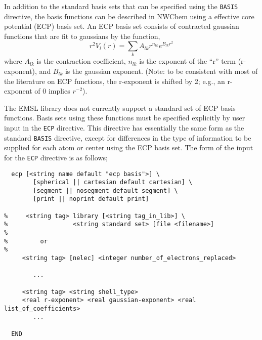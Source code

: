 \label{sec:ecp}

In addition to the standard basis sets that can be specified using the
\verb+BASIS+ directive, the basis functions can be described in NWChem
using a effective core potential (ECP) basis set.  An ECP basis set
consists of contracted gaussian functions that are fit to gaussians by the
function,
\[
r^2V_l(r) = \sum_{k} A_{lk} r^{n_{lk}} e^{B_{lk}r^{2}}
\]
where $A_{lk}$ is the contraction coefficient, $n_{lk}$ is the
exponent of the ``r'' term (r-exponent), and $B_{lk}$ is the gaussian
exponent.  (Note: to be consistent with most of the literature on ECP
functions, the r-exponent is shifted by 2; e.g., an r-exponent of 0 
implies $r^{-2}$).

The EMSL library does not currently support a standard set of ECP basis
functions.  Basis sets using these functions must be specified explicitly
by user input in the \verb+ECP+ directive.  This directive has
essentially the same form as the standard \verb+BASIS+ directive,
except for differences in the type of information to be supplied for
each atom or center using the ECP basis set.  The form of the input for
the \verb+ECP+ directive is as follows;

\begin{verbatim}
  ecp [<string name default "ecp basis">] \
        [spherical || cartesian default cartesian] \
        [segment || nosegment default segment] \
        [print || noprint default print]

%     <string tag> library [<string tag_in_lib>] \
%                  <string standard set> [file <filename>]
%
%         or
%
     <string tag> [nelec] <integer number_of_electrons_replaced>
 
        ...

     <string tag> <string shell_type>
     <real r-exponent> <real gaussian-exponent> <real list_of_coefficients>
        ...
     
  END
\end{verbatim}    


